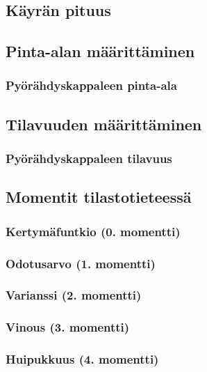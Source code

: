 \documentclass[../integrointiopas.tex]{subfiles}
\begin{document}
	\subsection{Käyrän pituus}
	
	\subsection{Pinta-alan määrittäminen}
	
	\subsubsection{Pyörähdyskappaleen pinta-ala}
	
	\subsection{Tilavuuden määrittäminen}
	
	\subsubsection{Pyörähdyskappaleen tilavuus}
	
	\subsection{Momentit tilastotieteessä}
	
	\subsubsection{Kertymäfuntkio (0. momentti)}
	
	\subsubsection{Odotusarvo (1. momentti)}
	
	\subsubsection{Varianssi (2. momentti)}
	
	\subsubsection{Vinous (3. momentti)}
	
	\subsubsection{Huipukkuus (4. momentti)}
	
\end{document}
